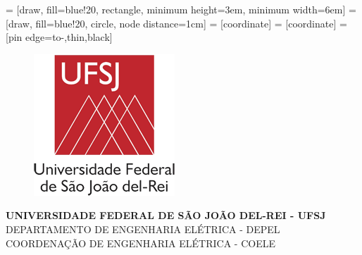 \documentclass[12pt,           %
a4paper,                       %
openany,                       %
oneside,                       %
chapter=TITLE,                 %
english,                       %
spanish,                       %
brazil,                        %
sumario=tradicional]{abntex2}  %
\begin{document}
\setcounter{page}{1}  %
 = [draw, fill=blue!20, rectangle, 
    minimum height=3em, minimum width=6em]
 = [draw, fill=blue!20, circle, node distance=1cm]
 = [coordinate]
 = [coordinate]
 = [pin edge={to-,thin,black}]
	
\begin{minipage}{.2\linewidth}
	\begin{figure}[H]  %
	    \begin{center}
	        \includegraphics[angle=0, scale=.45]{logo.png}\\       	
	    \end{center}
	\end{figure}	
\end{minipage}
\begin{minipage}{.8\linewidth}
	\begin{center}
	\begin{SingleSpace}                         %
		\textbf{UNIVERSIDADE FEDERAL DE SÃO JOÃO DEL-REI - UFSJ}\\
			DEPARTAMENTO DE ENGENHARIA ELÉTRICA - DEPEL\\
			COORDENAÇÃO DE ENGENHARIA ELÉTRICA - COELE\\	
			\end{SingleSpace}	                        %
		\end{center}
	\end{minipage}  
	\begin{center}
		\vspace{3.5cm}
		\textbf{\imprimirautor}\\
		\vspace{4cm}
		\textbf{\imprimirtitulo}
	\end{center}
	\vspace{3.5cm}                                      %
\end{document}
